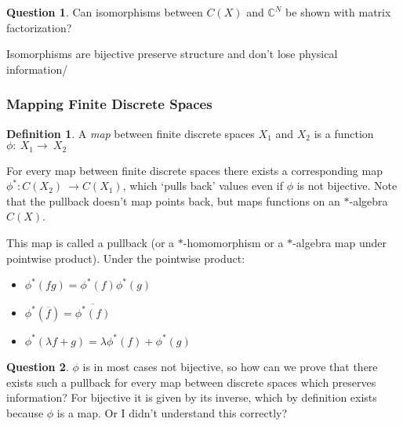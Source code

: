 \documentclass[a4paper]{article}
\theoremstyle{definition}
\newtheorem{definition}{Definition}
\theoremstyle{definition}
\newtheorem{question}{Question}
\theoremstyle{definition}
\theoremstyle{theorem}
\theoremstyle{theorem}
\begin{document}
\begin{question}
    Can isomorphisms between $C(X)$ and $\mathbb{C}^N$ be shown with matrix factorization?
\end{question}
    Isomorphisms are bijective preserve structure and don't lose physical information/

\subsubsection{Mapping Finite Discrete Spaces}

\begin{definition}
    A \textit{map} between finite discrete spaces $X_1$ and $X_2$ is a function $\phi:\ X_1 \rightarrow\ X_2$
\end{definition}

For every map between finite discrete spaces there exists a corresponding map \\
$\phi ^*:C(X_2)\ \rightarrow C(X_1)$, which `pulls back' values even if $\phi$ is not bijective.
Note that the pullback doesn't map points back, but maps functions on an $*$-algebra $C(X)$.


This map is called a pullback (or a $*$-homomorphism or a $*$-algebra map under pointwise product).
Under the pointwise product:
\begin{itemize}
    \item $\phi ^*(fg) = \phi ^*(f) \phi ^*(g)$
    \item $\phi ^*(\overline{f}) = \overline{\phi ^*(f)}$
    \item $\phi ^*(\lambda f + g) = \lambda \phi ^*(f) + \phi ^*(g)$
\end{itemize}

\begin{question}
    $\phi$ is in most cases not bijective, so how can we prove that there exists such a
    pullback for every map between discrete spaces which preserves information? For bijective
    it is given by its inverse, which by definition exists because $\phi$ is a map.
    Or I didn't understand this correctly?
\end{question}
\end{document}
